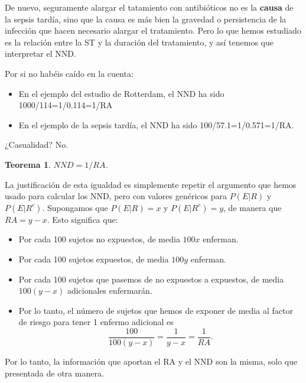 \documentclass[
]{book}
\providecommand{\tightlist}{%
  \setlength{\itemsep}{0pt}\setlength{\parskip}{0pt}}
\newtheorem{theorem}{Teorema}[chapter]
\theoremstyle{definition}
\theoremstyle{definition}
\theoremstyle{definition}
\theoremstyle{definition}
\theoremstyle{remark}
\begin{document}
\begin{rmdnote}
De nuevo, seguramente alargar el tatamiento con antibióticos no es la \textbf{causa} de la sepsis tardía, sino que la causa es más bien la gravedad o persistencia de la infección que hacen necesario alargar el tratamiento. Pero lo que hemos estudiado es la relación entre la ST y la duración del tratamiento, y así tenemos que interpretar el NND.
\end{rmdnote}

\begin{rmdimportant}
Por si no habéis caído en la cuenta:

\begin{itemize}
\tightlist
\item
  En el ejemplo del estudio de Rotterdam, el NND ha sido 1000/114=1/0.114=1/RA
\item
  En el ejemplo de la sepsis tardía, el NND ha sido 100/57.1=1/0.571=1/RA.
\end{itemize}

¿Casualidad? No.
\end{rmdimportant}

\begin{theorem}
\protect\hypertarget{thm:unnamed-chunk-182}{}\label{thm:unnamed-chunk-182}\(NND=1/RA\).
\end{theorem}

\begin{rmdcorbes}
La justificación de esta igualdad es simplemente repetir el argumento que hemos usado para calcular los NND, pero con valores genéricos para \(P(E|R)\) y \(P(E|R^c)\). Supongamos que \(P(E|R)=x\) y \(P(E|R^c)=y\), de manera que \(RA=y-x\). Esto significa que:

\begin{itemize}
\item
  Por cada 100 sujetos no expuestos, de media \(100x\) enferman.
\item
  Por cada 100 sujetos expuestos, de media \(100y\) enferman.
\item
  Por cada 100 sujetos que pasemos de no expuestos a expuestos, de media \(100(y-x)\) adicionales enfermarán.
\item
  Por lo tanto, el número de sujetos que hemos de exponer de media al factor de riesgo para tener 1 enfermo adicional es
  \[
  \frac{100}{100(y-x)}=\frac{1}{y-x}=\frac{1}{RA}.
  \]
\end{itemize}
\end{rmdcorbes}

Por lo tanto, la información que aportan el RA y el NND son la misma, solo que presentada de otra manera.
\end{document}
